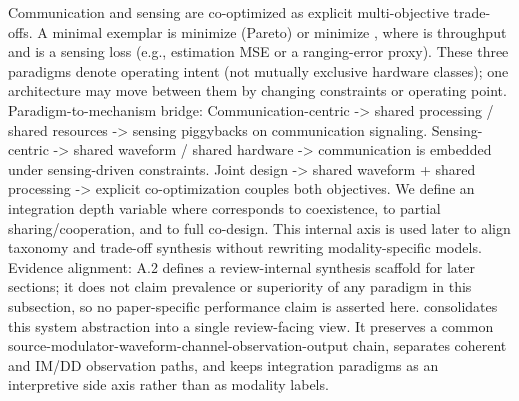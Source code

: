 {} Communication and sensing are co-optimized as explicit multi-objective trade-offs. A minimal exemplar is minimize  (Pareto) or minimize , where  is throughput and  is a sensing loss (e.g., estimation MSE or a ranging-error proxy).\markdownRendererParagraphSeparator
{}These three paradigms denote operating intent (not mutually exclusive hardware classes); one architecture may move between them by changing constraints or operating point.\markdownRendererParagraphSeparator
{}Paradigm-to-mechanism bridge:\markdownRendererInterblockSeparator
{}\markdownRendererUlBeginTight
\markdownRendererUlItem Communication-centric -> shared processing / shared resources -> sensing piggybacks on communication signaling.\markdownRendererUlItemEnd 
\markdownRendererUlItem Sensing-centric -> shared waveform / shared hardware -> communication is embedded under sensing-driven constraints.\markdownRendererUlItemEnd 
\markdownRendererUlItem Joint design -> shared waveform + shared processing -> explicit co-optimization couples both objectives.\markdownRendererUlItemEnd 
\markdownRendererUlEndTight \markdownRendererInterblockSeparator
{}We define an integration depth variable\markdownRendererSoftLineBreak
{}\markdownRendererSoftLineBreak
{}where  corresponds to coexistence,  to partial sharing/cooperation, and  to full co-design. This internal axis is used later to align taxonomy and trade-off synthesis without rewriting modality-specific models.\markdownRendererParagraphSeparator
{}Evidence alignment: A.2 defines a review-internal synthesis scaffold for later sections; it does not claim prevalence or superiority of any paradigm in this subsection, so no paper-specific performance claim is asserted here.\markdownRendererParagraphSeparator
{} consolidates this system abstraction into a single review-facing view. It preserves a common source-modulator-waveform-channel-observation-output chain, separates coherent and IM/DD observation paths, and keeps integration paradigms as an interpretive side axis rather than as modality labels.\markdownRendererParagraphSeparator
